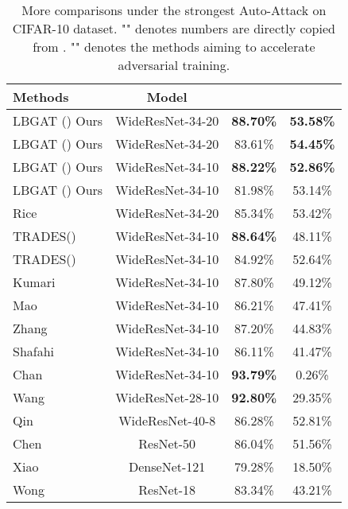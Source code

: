 \documentclass[final]{cvpr}
\begin{document}
\begin{table*}[h]
	\large
	\centering
	\caption{More comparisons under the strongest Auto-Attack on CIFAR-10 dataset.  "\dag" denotes numbers are directly copied from \cite{croce2020reliable}. "" denotes the methods aiming to accelerate adversarial training.} 
	\vspace{0.1cm}
	\begin{tabular}{l|c|c|c}
		\textbf{Methods} & Model & & \\
		\hline
		\hline
		LBGAT () Ours                 &WideResNet-34-20 &\textbf{88.70\%} &\textbf{53.58\%} \\
		LBGAT () Ours                 &WideResNet-34-20 &83.61\% &\textbf{54.45\%} \\
		LBGAT () Ours                 &WideResNet-34-10 &\textbf{88.22\%} &\textbf{52.86\%} \\
		LBGAT () Ours                 &WideResNet-34-10 &81.98\% &53.14\% \\
		\hline
		\hline
		Rice \etal \cite{rice2020overfitting} \dag    &WideResNet-34-20 &85.34\%	&53.42\% \\
		TRADES()                            &WideResNet-34-10 &\textbf{88.64\%} &48.11\%\\
		TRADES()                            &WideResNet-34-10 &84.92\% &52.64\% \\ 
		Kumari \etal \cite{kumari2019harnessing} \dag &WideResNet-34-10 &87.80\%	&49.12\% \\
		Mao \etal \cite{mao2019metric} \dag           &WideResNet-34-10 &86.21\%	&47.41\% \\
		Zhang \etal \cite{zhang2019you} \dag    &WideResNet-34-10 &87.20\%	&44.83\% \\
		Shafahi \etal \cite{shafahi2019adversarial} \dag  &WideResNet-34-10 &86.11\% &41.47\% \\
		Chan \etal \cite{chan2019jacobian} \dag                 &WideResNet-34-10 &\textbf{93.79\%} &0.26\% \\
		Wang \etal \cite{wang2019bilateral} \dag          &WideResNet-28-10 &\textbf{92.80\%} &29.35\% \\
		Qin \etal \cite{qin2019adversarial} \dag         &WideResNet-40-8  &86.28\% &52.81\% \\
		Chen \etal \cite{chen2020adversarial} \dag       &ResNet-50        &86.04\% &51.56\% \\
		Xiao \etal \cite{xiao2019enhancing} \dag         &DenseNet-121     &79.28\% &18.50\% \\
		Wong \etal \cite{wong2020fast} \dag              &ResNet-18        &83.34\% &43.21\% \\
		\hline
		\hline
	\end{tabular}
	\label{tab:more_aa_cifar10}
\end{table*}
\newpage
\end{document}

